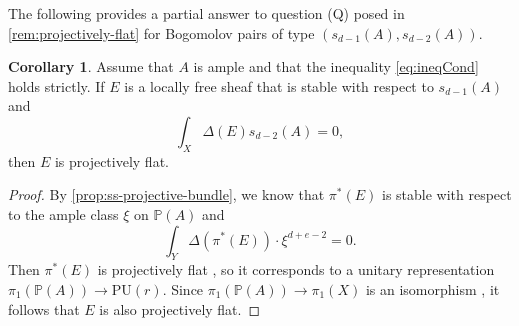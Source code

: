 \documentclass[a4,reqno]{amsart}
\theoremstyle{definition}
\newtheorem{corollary}[theorem]{Corollary}
\renewcommand{\P}{\mathbb{P}}
\numberwithin{equation}{section}
\begin{document}

The following provides a partial answer to question (Q) posed in \cref{rem:projectively-flat} for Bogomolov pairs of type $(s_{d-1}(A),s_{d-2}(A))$.

\begin{corollary}\label{cor:eqBogomolov-forSegre}
Assume that $A$ is ample and that the inequality \eqref{eq:ineqCond} holds strictly. If $E$ is a locally free sheaf that is stable with respect to $s_{d-1}(A)$ and
\[
    \int_X \Delta(E) s_{d-2}(A) = 0,
\]
then $E$ is projectively flat. 
\end{corollary}
\begin{proof}
By \cref{prop:ss-projective-bundle}, we know that $\pi^*(E)$ is stable with respect to the ample class $\xi$ on $\P(A)$ and
\[
    \int_Y \Delta(\pi^*(E)) \cdot \xi^{d+e-2} = 0.
\]
Then $\pi^*(E)$ is projectively flat \cite[Theorem 4.4.7]{KobayashiVectorBundles}, so it corresponds to a unitary representation $\pi_1(\P(A)) \to \mathrm{PU}(r)$. Since $\pi_1(\P(A)) \to \pi_1(X)$ is an isomorphism \cite[Theorem 4.41]{HatcherAT}, it follows that $E$ is also projectively flat.
\end{proof}
\end{document}
